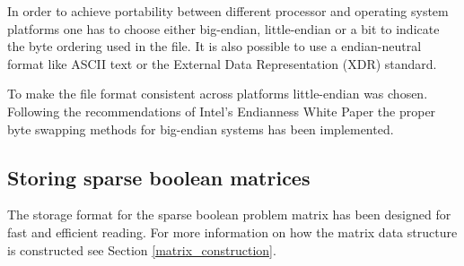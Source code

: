 In order to achieve portability between different processor and operating system platforms one has to choose either big-endian, little-endian or a bit to indicate the byte ordering used in the file.
It is also possible to use a endian-neutral format like ASCII text or the External Data Representation (XDR) \cite{RFC4506} standard.

To make the file format consistent across platforms little-endian was chosen.
Following the recommendations of Intel's Endianness White Paper \cite{intel-endian} the proper byte swapping methods for big-endian systems has been implemented.




\subsection{Storing sparse boolean matrices}

The storage format for the sparse boolean problem matrix has been designed for fast and efficient reading.
For more information on how the matrix data structure is constructed see Section \vref{matrix_construction}.



